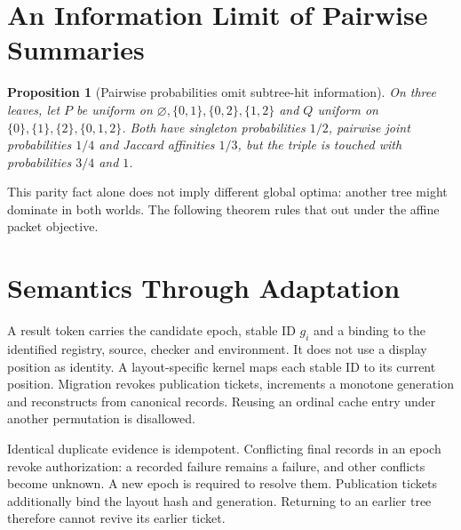 \documentclass[preprint,12pt]{elsarticle}
\newtheorem{proposition}[theorem]{Proposition}
\theoremstyle{definition}\newtheorem{definition}[theorem]{Definition}
\begin{document}
\section{An Information Limit of Pairwise Summaries}
\begin{proposition}[Pairwise probabilities omit subtree-hit information]\label{prop:pairwise}
On three leaves, let $P$ be uniform on
$\varnothing,\{0,1\},\{0,2\},\{1,2\}$ and $Q$ uniform on
$\{0\},\{1\},\{2\},\{0,1,2\}$. Both have singleton probabilities $1/2$,
pairwise joint probabilities $1/4$ and Jaccard affinities $1/3$, but the
triple is touched with probabilities $3/4$ and $1$.
\end{proposition}
This parity fact alone does not imply different global optima: another tree
might dominate in both worlds. The following theorem rules that out under
the affine packet objective.




\section{Semantics Through Adaptation}\label{sec:jsafety}
A result token carries the candidate epoch, stable ID $g_i$ and a binding
to the identified registry, source, checker and environment. It does not use
a display position as identity. A layout-specific kernel maps each stable
ID to its current position. Migration revokes publication tickets,
increments a monotone generation and reconstructs from canonical records.
Reusing an ordinal cache entry under another permutation is disallowed.

Identical duplicate evidence is idempotent. Conflicting final records in an
epoch revoke authorization: a recorded failure remains a failure, and other
conflicts become unknown. A new epoch is required to resolve them.
Publication tickets additionally bind the layout hash and generation.
Returning to an earlier tree therefore cannot revive its earlier ticket.
\end{document}
